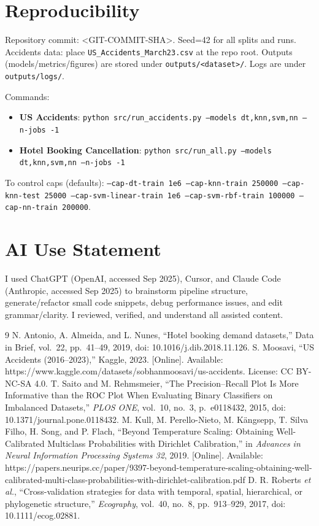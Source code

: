 \documentclass[conference]{IEEEtran}
\newcommand{\datasetA}{Hotel Booking Cancellation}
\newcommand{\datasetB}{US Accidents}
\newcommand{\commitsha}{<GIT-COMMIT-SHA>}
\newcommand{\seed}{42}
\begin{document}
\section*{Reproducibility}
Repository commit: \commitsha. Seed=\seed{} for all splits and runs. Accidents data: place \texttt{US\_Accidents\_March23.csv} at the repo root. Outputs (models/metrics/figures) are stored under \texttt{outputs/<dataset>/}. Logs are under \texttt{outputs/logs/}.

Commands:
\begin{itemize}
\item \textbf{\datasetB{}}: \texttt{python src/run\_accidents.py --models dt,knn,svm,nn --n-jobs -1}
\item \textbf{\datasetA{}}: \texttt{python src/run\_all.py --models dt,knn,svm,nn --n-jobs -1}
\end{itemize}
To control caps (defaults): \texttt{--cap-dt-train 1e6 --cap-knn-train 250000 --cap-knn-test 25000 --cap-svm-linear-train 1e6 --cap-svm-rbf-train 100000 --cap-nn-train 200000}.

\section*{AI Use Statement}
I used ChatGPT (OpenAI, accessed Sep 2025), Cursor, and Claude Code (Anthropic, accessed Sep 2025) to brainstorm pipeline structure, generate/refactor small code snippets, debug performance issues, and edit grammar/clarity. I reviewed, verified, and understand all assisted content.

\begin{thebibliography}{9}
 N. Antonio, A. Almeida, and L. Nunes, ``Hotel booking demand datasets,'' Data in Brief, vol.~22, pp.~41--49, 2019, doi: 10.1016/j.dib.2018.11.126.
 S. Moosavi, ``US Accidents (2016--2023),'' Kaggle, 2023. [Online]. Available: https://www.kaggle.com/datasets/sobhanmoosavi/us-accidents. License: CC BY-NC-SA 4.0.
 T. Saito and M. Rehmsmeier, ``The Precision--Recall Plot Is More Informative than the ROC Plot When Evaluating Binary Classifiers on Imbalanced Datasets,'' \textit{PLOS ONE}, vol.~10, no.~3, p.~e0118432, 2015, doi: 10.1371/journal.pone.0118432.
 M. Kull, M. Perello-Nieto, M. K{\"a}ngsepp, T. Silva Filho, H. Song, and P. Flach, ``Beyond Temperature Scaling: Obtaining Well-Calibrated Multiclass Probabilities with Dirichlet Calibration,'' in \textit{Advances in Neural Information Processing Systems 32}, 2019. [Online]. Available: https://papers.neurips.cc/paper/9397-beyond-temperature-scaling-obtaining-well-calibrated-multi-class-probabilities-with-dirichlet-calibration.pdf
 D. R. Roberts \textit{et al.}, ``Cross-validation strategies for data with temporal, spatial, hierarchical, or phylogenetic structure,'' \textit{Ecography}, vol.~40, no.~8, pp.~913--929, 2017, doi: 10.1111/ecog.02881.
\end{thebibliography}
\end{document}
